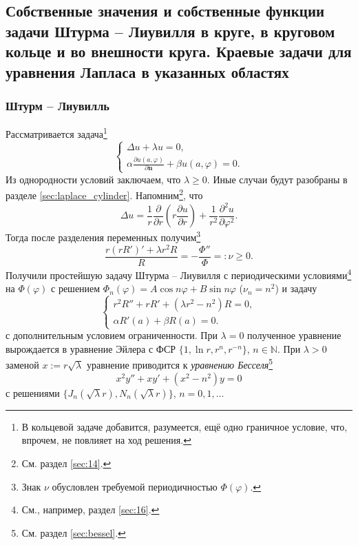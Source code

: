 \subsection{Собственные значения и собственные функции задачи Штурма -- Лиувилля
в круге, в круговом кольце и во внешности круга. Краевые задачи для уравнения
Лапласа в указанных областях}\label{sec:20}
\subsubsection{Штурм -- Лиувилль}
Рассматривается задача\footnote{В кольцевой задаче добавится, разумеется, ещё
одно граничное условие, что, впрочем, не повлияет на ход решения.}
\[
  \begin{cases}
    \Delta u + \lambda u = 0,\\
    \alpha \frac{\partial u(a, \varphi)}{\partial \mathbf n} + \beta u(a, \varphi) = 0.
  \end{cases}
\]
Из однородности условий заключаем, что $ \lambda \geqslant 0 $. Иные случаи будут разобраны в разделе
\ref{sec:laplace_cylinder}. Напомним\footnote{См. раздел \ref{sec:14}.}, что  
\[
    \Delta u = \frac{1}{r} \frac{\partial}{\partial r} \left( r \frac{\partial
    u}{\partial r} \right) + \frac{1}{r^2} \frac{\partial^2 u}{\partial
  \varphi^2}.
\]
Тогда после разделения переменных получим\footnote{Знак $ \nu $ обусловлен
требуемой периодичностью $ \Phi(\varphi) $.}
\[
    \frac{r (r R')' + \lambda r^2 R}{R} = - \frac{\Phi''}{\Phi} =: \nu \geqslant
    0.
\]
Получили простейшую задачу Штурма -- Лиувилля с периодическими
условиями\footnote{См., например, раздел \ref{sec:16}.}
на $ \Phi(\varphi) $ с решением $ \Phi_n(\varphi) = A\cos n\varphi + B\sin
n\varphi $ ($ \nu_n = n^2 $) и задачу
\begin{equation}
  \label{eq:bessel_eq}
  \begin{cases}
    r^2R'' + rR' + (\lambda r^2 - n^2) R = 0,\\
    \alpha R'(a) + \beta R(a) = 0.
  \end{cases}
\end{equation}
с дополнительным условием ограниченности. При $ \lambda = 0 $ полученное
уравнение вырождается в уравнение Эйлера с ФСР $ \{1, \ln r , r^n, r^{-n}\}$, $n
\in \mathbb N$. При $ \lambda > 0 $ заменой $ x := r\sqrt\lambda $
уравнение
приводится к \emph{уравнению Бесселя}\footnote{См. раздел \ref{sec:bessel}.} 
\[
    x^2y'' + xy' + (x^2 - n^2) y = 0
\]
с решениями $ \{J_n(\sqrt \lambda r), N_n(\sqrt\lambda r)\} $, $ n = 0, 1, \ldots $
